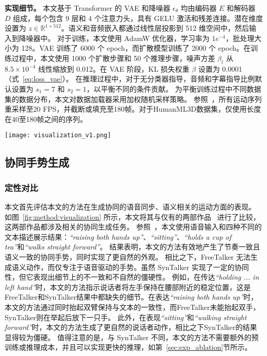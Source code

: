 \textbf{实现细节。}
本文基于 Transformer 的 VAE 和降噪器 $\epsilon_\theta$ 均由编码器 $E$ 和解码器 $D$ 组成，每个包含 9 层和 4 个注意力头，具有 GELU 激活和残差连接。潜在维度设置为 $z \in \mathbb{R}^{1 \times 512}$。语义和音频嵌入都通过线性层投影到 512 维空间中，然后输入到降噪器中。
对于训练，本文使用 AdamW 优化器，学习率为 $1e^{-4}$，批处理大小为 128。VAE 训练了 6000 个 epoch，而扩散模型训练了 2000 个 epoch。在训练过程中，本文使用 1000 个扩散步骤和 50 个推理步骤，噪声方差 $\beta_t$ 从 $8.5 \times 10^{-4}$ 线性缩放到 0.012。在 VAE 阶段，KL 损失权重 $\beta$ 设置为 0.0001（式~\eqref{eq:loss_vae}）。
在推理过程中，对于无分类器指导，音频和字幕指导比例默认设置为 $s_1=7$ 和 $s_2=1$，以平衡不同的条件贡献。
为平衡训练过程中不同数据集的数据分布，本文对数据加载器采用加权随机采样策略。
参照~\cite{yang2024freetalker}，所有运动序列重采样至20 FPS，并截断或填充至180帧。对于HumanML3D数据集，仅使用长度在40至180帧之间的序列。

\begin{figure*}[t]
  \centering
  \texttt{[image: visualization\_v1.png]}
  \caption{协同手势生成的定性比较。 \textcolor{red}{红色} 框突出显示语义不一致，\textcolor[RGB]{204,153,0}{黄色} 框表示不自然的动作，\textcolor[RGB]{34,139,34}{绿色} 框表示协同良好的自然手势。}
  \label{fig:method:visualization}
\end{figure*}


\subsection{协同手势生成}
\subsubsection{定性对比}
本文首先评估本文的方法在生成协同的语音同步、语义相关的运动方面的表现。
如图~\ref{fig:method:visualization} 所示，本文将其与仅有的两部作品~\cite{yang2024freetalker,chen2024syntalker} 进行了比较，这两部作品都涉及相关的协同生成任务。
参照~\cite{chen2024syntalker}，本文使用语音输入和四种不同的文本描述展示结果：\textit{``raising both hands up''}、\textit{``sitting''}、\textit{``holds a cup of tea''}和\textit{``walks straight forward''}。
结果表明，本文的方法有效地产生了节奏一致且语义一致的协同手势，同时实现了更自然的外观。
相比之下，FreeTalker 无法生成语义动作，而仅专注于语音驱动的手势。虽然 SynTalker 实现了一定的协同性，但它表现出细节上的不一致和不自然的僵硬性。
例如，在传达\textit{``holding ... in left hand''}时，本文的方法指示说话者将左手保持在腰部附近的稳定位置，这是FreeTalker和SynTalker结果中都缺失的细节。在表达\textit{``raising both hands up''}时，本文的方法通过同时抬起双臂保持与文本的一致性，而FreeTalker未能抬起双手，SynTalker则在举起后放下一只手。
此外，在表现\textit{``sitting''}和\textit{``walking straight forward''}时，本文的方法生成了更自然的说话者动作，相比之下SynTalker的结果显得较为僵硬。
值得注意的是，与 SynTalker 不同，本文的方法不需要额外的预训练或推理成本，并且可以实现更快的推理，如第~\ref{sec:exp_ablation}节所示。




